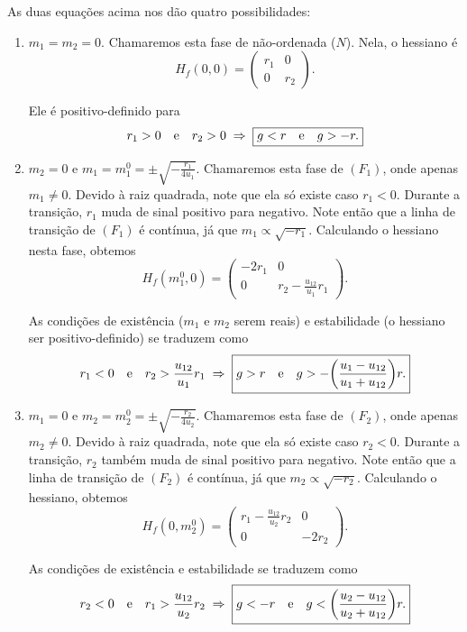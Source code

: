 \documentclass[a4paper,10pt]{article}
\begin{document}
As duas equações acima nos dão quatro possibilidades:
\begin{enumerate}
\item $m_1 = m_2 = 0$. Chamaremos esta fase de não-ordenada ($N$). Nela, o hessiano é
$$
H_f(0, 0) =
\begin{pmatrix}
r_1 & 0 \\
0 & r_2
\end{pmatrix}.
$$

Ele é positivo-definido para
$$
r_1 > 0 \quad \mathrm{e} \quad r_2 > 0 \; \Rightarrow \; \boxed{g < r \quad \mathrm{e} \quad g > -r.}
$$



\item $m_2 = 0$ e $m_1 = m^0_1 = \pm\sqrt{-\frac{r_1}{4 u_1}}$. Chamaremos esta fase de $(F_1)$, onde apenas $m_1 \neq 0$. Devido à raiz quadrada, note que ela só existe caso $r_1 < 0$. Durante a transição, $r_1$ muda de sinal positivo para negativo. Note então que a linha de transição de $(F_1)$ é contínua, já que $m_1 \propto \sqrt{-r_1}$. Calculando o hessiano nesta fase, obtemos
$$
H_f(m_1^0, 0) =
\begin{pmatrix}
-2 r_1 & 0 \\
0 & r_2 - \frac{u_{12}}{u_1} r_1
\end{pmatrix}.
$$

As condições de existência ($m_1$ e $m_2$ serem reais) e estabilidade (o hessiano ser positivo-definido) se traduzem como
$$
r_1 < 0 \quad \mathrm{e} \quad r_2 > \frac{u_{12}}{u_1} r_1
\; \Rightarrow \;
\boxed{g > r \quad \mathrm{e} \quad g > -\qty(\frac{u_1 - u_{12}}{u_1 + u_{12}}) r. }
$$



\item $m_1 = 0$ e $m_2 = m^0_2 = \pm\sqrt{-\frac{r_2}{4 u_2}}$. Chamaremos esta fase de $(F_2)$, onde apenas $m_2 \neq 0$. Devido à raiz quadrada, note que ela só existe caso $r_2 < 0$. Durante a transição, $r_2$ também muda de sinal positivo para negativo. Note então que a linha de transição de $(F_2)$ é contínua, já que $m_2 \propto \sqrt{-r_2}$. Calculando o hessiano, obtemos
$$
H_f(0, m_2^0) =
\begin{pmatrix}
r_1 - \frac{u_{12}}{u_2} r_2 & 0 \\
0 & -2 r_2
\end{pmatrix}.
$$

As condições de existência e estabilidade se traduzem como
$$
r_2 < 0 \quad \mathrm{e} \quad r_1 > \frac{u_{12}}{u_2} r_2
\; \Rightarrow \;
\boxed{g < -r \quad \mathrm{e} \quad g < \qty(\frac{u_{2} - u_{12}}{u_2 + u_{12}}) r. }
$$






\end{enumerate}
\end{document}

